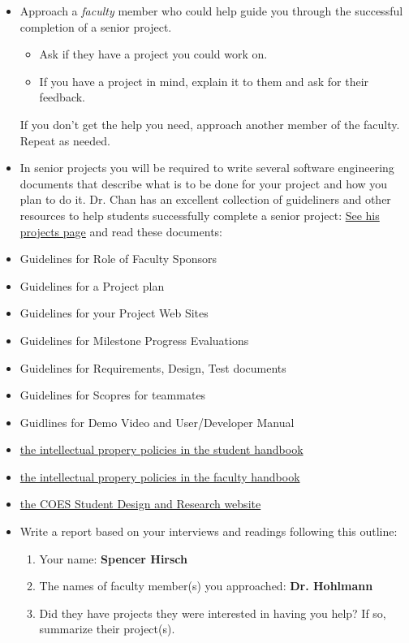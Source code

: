 \documentclass{article}
\begin{document}
\begin{itemize}
    \item Approach a \textit{faculty} member who could help guide you through the
          successful completion of a senior project.
          \begin{itemize}
            \item Ask if they have a project you could work on.
            \item If you have a project in mind, explain it to them and ask for their
                  feedback.
          \end{itemize}
          If you don't get the help you need, approach another member of the faculty.
          Repeat as needed.
    \item In senior projects you will be required to write several software engineering
           documents that describe what is to be done for your project and how you plan to do it.
           Dr. Chan has an excellent collection of guideliners and other resources to help students
           successfully complete a senior project: \href{https://cs.fit.edu/~pkc/classes/seniorProjects/}{See his projects page}
           and read these documents:
    \item Guidelines for Role of Faculty Sponsors
    \item Guidelines for a Project plan
    \item Guidelines for your Project Web Sites
    \item Guidelines for Milestone Progress Evaluations
    \item Guidelines for Requirements, Design, Test documents
    \item Guidelines for Scopres for teammates
    \item Guidlines for Demo Video and User/Developer Manual
    \item \href{https://www.fit.edu/policies/student-handbook/}{the intellectual propery policies in the student handbook}
    \item \href{https://www.fit.edu/policies/faculty/}{the intellectual propery policies in the faculty handbook}
    \item \href{https://www.fit.edu/engineering-and-science/academics-and-learning/student-design-and-research}{the COES Student Design and Research website}
    \item Write a report based on your interviews and readings following this outline:
          \begin{enumerate}
            \item Your name: \textbf{Spencer Hirsch}
            \item The names of faculty member(s) you approached: \textbf{Dr. Hohlmann}
            \item Did they have projects they were interested in having you help? 
            If so, summarize their project(s). \\


\end{enumerate}
\end{itemize}
\end{document}
